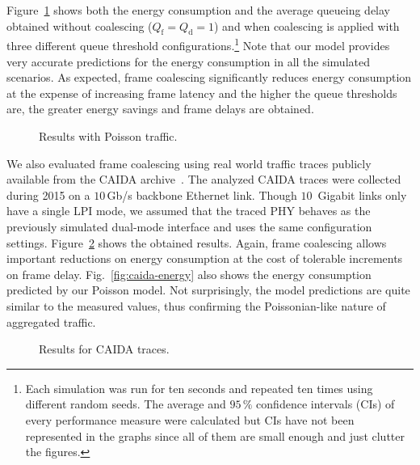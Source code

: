 \documentclass[journal,10pt,letterpaper]{IEEEtran}
\begin{document}
Figure~\ref{fig:poisson} shows both the energy consumption and the
average queueing delay obtained without coalescing ($Q_{\mathrm{f}} =
Q_{\mathrm{d}} = 1$) and when coalescing is applied with three
different queue threshold configurations.\footnote{Each simulation was
  run for ten seconds and repeated ten times using different random
  seeds. The average and $95\,\%$ confidence intervals (CIs) of every
  performance measure were calculated but CIs have not been
  represented in the graphs since all of them are small enough and
  just clutter the figures.}  Note that our model provides very
accurate predictions for the energy consumption in all the simulated
scenarios. As expected, frame coalescing significantly reduces energy
consumption at the expense of increasing frame latency and the higher
the queue thresholds are, the greater energy savings and frame delays
are obtained.

\begin{figure}[t]
  \centering
  \caption{Results with Poisson traffic.}
  \label{fig:poisson}
\end{figure}

We also evaluated frame coalescing using real world traffic traces
publicly available from the CAIDA archive~\cite{caida15}. The analyzed
CAIDA traces were collected during 2015 on a $10\,$Gb/s backbone
Ethernet link. Though $10$~Gigabit links only have a single LPI mode,
we assumed that the traced PHY behaves as the previously simulated
dual-mode interface and uses the same configuration
settings. Figure~\ref{fig:caida} shows the obtained results. Again,
frame coalescing allows important reductions on energy consumption at
the cost of tolerable increments on frame
delay. Fig.~\ref{fig:caida-energy} also shows the energy consumption
predicted by our Poisson model. Not surprisingly, the model
predictions are quite similar to the measured values, thus confirming
the Poissonian-like nature of aggregated traffic.

\begin{figure}[t]
  \centering 
  \caption{Results for CAIDA traces.}
  \label{fig:caida}
\end{figure}
\end{document}
